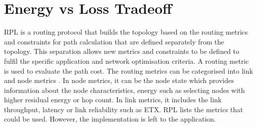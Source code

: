 \chapter{Energy vs Loss Tradeoff}
\label{energyLoss}

RPL is a routing protocol that builds the topology based on the routing metrics and constraints for path calculation that are defined separately from the topology. This separation allows new metrics and constraints to be defined to fulfil the specific application and network optimisation criteria. A routing metric is used to evaluate the path cost. The routing metrics can be categorised into link and node metrics \cite{routingmetrics}. In node metrics, it can be the node state which provides information about the node characteristics, energy such as selecting nodes with higher residual energy or hop count. In link metrics, it includes the link throughput, latency or link reliability such as ETX. RPL lists the metrics that could be used. However, the implementation is left to the application. 



